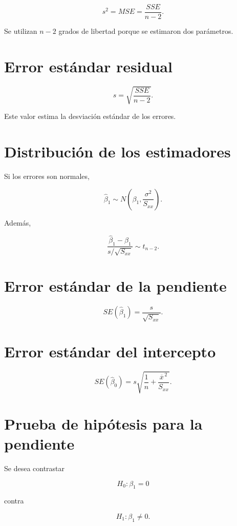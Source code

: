\documentclass[
  spanish,
  11pt,
  letterpaper,
  DIV=11,
  numbers=noendperiod]{scrreprt}
\theoremstyle{definition}
\theoremstyle{plain}
\theoremstyle{definition}
\theoremstyle{remark}
\begin{document}
\[
s^2
=
MSE
=
\frac{
SSE
}{
n-2
}.
\]

Se utilizan \(n-2\) grados de libertad porque se estimaron dos
parámetros.

\section{Error estándar residual}\label{error-estuxe1ndar-residual}

\[
s
=
\sqrt{
\frac{
SSE
}{
n-2
}
}.
\]

Este valor estima la desviación estándar de los errores.

\section{Distribución de los
estimadores}\label{distribuciuxf3n-de-los-estimadores}

Si los errores son normales,

\[
\widehat{\beta}_1
\sim
N
\left(
\beta_1,
\frac{
\sigma^2
}{
S_{xx}
}
\right).
\]

Además,

\[
\frac{
\widehat{\beta}_1-\beta_1
}{
s/\sqrt{S_{xx}}
}
\sim
t_{n-2}.
\]

\section{Error estándar de la
pendiente}\label{error-estuxe1ndar-de-la-pendiente}

\[
SE
(
\widehat{\beta}_1
)
=
\frac{s}{\sqrt{S_{xx}}}.
\]

\section{Error estándar del
intercepto}\label{error-estuxe1ndar-del-intercepto}

\[
SE
(
\widehat{\beta}_0
)
=
s
\sqrt{
\frac{1}{n}
+
\frac{
\overline{x}^{\,2}
}{
S_{xx}
}
}.
\]

\section{Prueba de hipótesis para la
pendiente}\label{prueba-de-hipuxf3tesis-para-la-pendiente}

Se desea contrastar

\[
H_0:\beta_1=0
\]

contra

\[
H_1:\beta_1\neq 0.
\]
\end{document}
